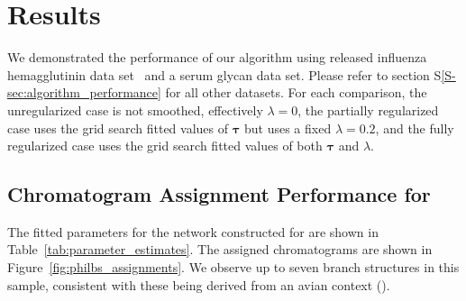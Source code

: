 \section{Results}
We demonstrated the performance of our algorithm using released influenza hemagglutinin
data set \philbs \ and a serum glycan data set\rphumanserum. Please refer to section
S\ref{S-sec:algorithm_performance} for all other datasets. For each comparison, the
unregularized case is not smoothed, effectively $\lambda = 0$, the partially regularized
case uses the grid search fitted values of $\mathbf{\tau}$ but uses a fixed $\lambda = 0.2$,
and the fully regularized case uses the grid search fitted values of both $\mathbf{\tau}$
and $\lambda$.




\subsection{Chromatogram Assignment Performance for \philbs}
    The fitted parameters for the network constructed for \philbs are shown in
    Table~\ref{tab:parameter_estimates}. The assigned chromatograms are shown in
    Figure~\ref{fig:philbs_assignments}. We observe up to seven branch structures in
    this sample, consistent with these \nglycans being derived from an avian context
    (\cite{Stanley2009,Khatri2016a}).

